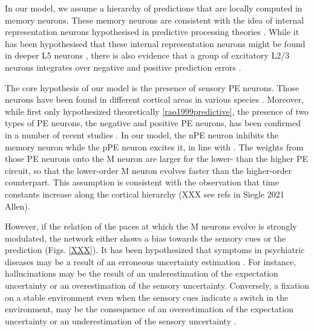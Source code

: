 \documentclass[10pt,a4paper,draft]{article}
\begin{document}
In our model, we assume a hierarchy of predictions that are locally computed in memory neurons. These memory neurons are consistent with the idea of internal representation neurons hypothesised in predictive processing theories \citep{bastos2012canonical, keller2018predictive}. While it has been hypothesised that these internal representation neurons might be found in deeper L5 neurons \citep{bastos2012canonical, heindorf2022reduction}, there is also evidence that a group of excitatory L2/3 neurons integrates over negative and positive prediction errors \citep{o2022prediction}.

The core hypothesis of our model is the presence of sensory PE neurons. Those neurons have been found in different cortical areas in various species \citep{eliades2008neural, keller2009neural, ayaz2019layer, audette2021temporally}. Moreover, while first only hypothesized theoretically \ref{rao1999predictive}, the presence of two types of PE neurons, the negative and positive PE neurons, has been confirmed in a number of recent studies \citep{keller2012sensorimotor, attinger2017visuomotor, jordan2020opposing, audette2021temporally, Zmarz2016XXX?necessary}. In our model, the nPE neuron inhibits the memory neuron while the pPE neuron excites it, in line with \citep{keller2018predictive}. The weights from those PE neurons onto the M neuron are larger for the lower- than the higher PE circuit, so that the lower-order M neuron evolves faster than the higher-order counterpart. This assumption is consistent with the observation that time constants increase along the cortical hierarchy (XXX see refs in Siegle 2021 Allen).

However, if the relation of the paces at which the M neurons evolve is strongly modulated, the network either shows a bias towards the sensory cues or the prediction (Figs. \ref{XXX}). It has been hypothesized that symptoms in psychiatric diseases may be a result of an erroneous uncertainty estimation \citep{yon2021precision}. For instance, hallucinations may be the result of an underestimation of the expectation uncertainty or an overestimation of the sensory uncertainty. Conversely, a fixation on a stable environment even when the sensory cues indicate a switch in the environment, may be the consequence of an overestimation of the expectation uncertainty or an underestimation of the sensory uncertainty \citep{yon2021precision}.

\end{document}

